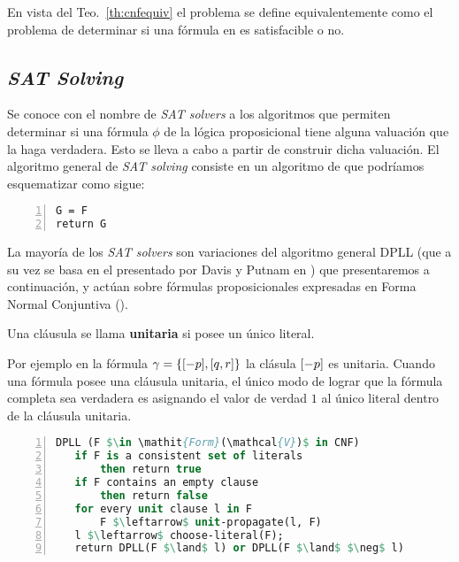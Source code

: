 En vista del Teo.~\ref{th:cnfequiv} el problema \sat se define equivalentemente
como el problema de determinar si una fórmula en \cnf es satisfacible o no.


\subsection{\emph{SAT Solving}}

Se conoce con el nombre de \emph{SAT solvers} a los algoritmos que permiten
determinar si una fórmula $\phi$ de la lógica proposicional tiene alguna
valuación que la haga verdadera. Esto se lleva a cabo a partir de construir dicha valuación.
El algoritmo general de  \emph{SAT solving} consiste en un algoritmo de \bt que podríamos esquematizar como sigue:

\begin{lstlisting}[mathescape,language=Pascal,frame=single,numbers=left,caption={Algoritmo \emph{naïf}},label=naif] 
G = F
return G
\end{lstlisting}

La mayoría de los \emph{SAT solvers} son variaciones del algoritmo general DPLL\cite{Davis:1962:MPT:368273.368557} (que a su vez se basa en el presentado por Davis y Putnam en \cite{Davis:1960:CPQ:321033.321034}) que presentaremos a continuación, y actúan sobre fórmulas proposicionales expresadas en Forma Normal Conjuntiva (\cnf). 

\begin{definition} 
 Una cláusula se llama \textbf{unitaria} si
posee un único literal.
\end{definition}

Por ejemplo en la fórmula $\gamma = \{[-p], [q, r]\}$ la clásula $[-p]$ es
unitaria. Cuando una fórmula \cnf posee una cláusula unitaria, el único modo de
lograr que la fórmula completa sea verdadera es asignando el valor de verdad
$1$ al único literal dentro de la cláusula unitaria.

\begin{lstlisting}[mathescape,language=Pascal,frame=single,numbers=left,caption={Algoritmo DPLL},label=DPLL] 
DPLL (F $\in \mathit{Form}(\mathcal{V})$ in CNF)
   if F is a consistent set of literals
       then return true
   if F contains an empty clause
       then return false
   for every unit clause l in F
       F $\leftarrow$ unit-propagate(l, F)
   l $\leftarrow$ choose-literal(F);
   return DPLL(F $\land$ l) or DPLL(F $\land$ $\neg$ l)
\end{lstlisting}

